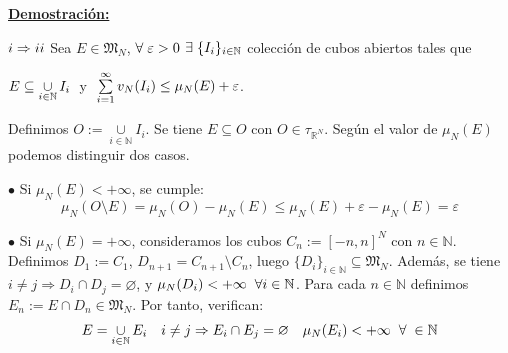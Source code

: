 \documentclass[12pt,a4paper]{article}
\newcommand{\R}{\mathbb{R}}
\newcommand{\N}{\mathbb{N}}
\newcommand{\smallcup}{\mathop{\cup}\limits}
\newcommand{\smallsum}{\mathop{\sum}\limits}
\newcommand{\dem}{
    \noindent \underline{\textbf{Demostración:}}
}
\begin{document}
\vspace{3mm} \dem

\vspace{2mm}
\begin{tcolorbox}
    $\romannumeral 1 \Rightarrow \romannumeral 2$ \hspace{3mm} Sea $E \in \mathfrak{M}_N$, $\forall \hspace{1mm} \varepsilon > 0$ $\exists \hspace{1mm} \{I_i\}_{i\in\N}$ colección de cubos abiertos tales que
\end{tcolorbox}
$E \subseteq \smallcup_{i\in\N} I_i \hspace{1mm}$ y $ \hspace{1mm}\smallsum_{i=1}^{\infty} v_N(I_i) \leq \mu_N(E) + \varepsilon$.

\vspace{2mm}
Definimos $O := \smallcup_{i\in\N} I_i$. Se tiene $E \subseteq O$ con $O \in \tau_{\R^N}$. Según el valor de $\mu_N(E)$ podemos distinguir dos casos.

\vspace{2mm}
$\bullet$ Si $\mu_N(E) < +\infty$, se cumple: \\[-3ex]
$$\mu_N(O \setminus E) = \mu_N(O) - \mu_N(E) \leq \mu_N(E) + \varepsilon - \mu_N(E) = \varepsilon$$

\vspace{2mm}
$\bullet$ Si $\mu_N(E) = +\infty$, consideramos los cubos $C_n := [-n,n]^N$ con $n \in \N$.
\newline Definimos $D_1 := C_1$, $D_{n+1} = C_{n+1} \setminus C_n$, \hspace{1mm} luego $\{D_i\}_{i \in \N} \subseteq \mathfrak{M}_N$.
\newline Además, se tiene $i \neq j \Rightarrow D_i \cap D_j = \varnothing$, \hspace{1mm} y \hspace{1mm} $\mu_N(D_i) < +\infty \hspace{2mm} \forall i \in \N$.
\newline Para cada $n \in \N$ definimos $E_n := E \cap D_n \in \mathfrak{M}_N$. Por tanto, verifican: \\[-5ex]
\begin{align*}
    E = \smallcup_{i\in\N} E_i && i \neq j \Rightarrow E_i \cap E_j = \varnothing && \mu_N(E_i) < +\infty \hspace{2mm} \forall \hspace{1mm} \in \N
\end{align*}
\end{document}
